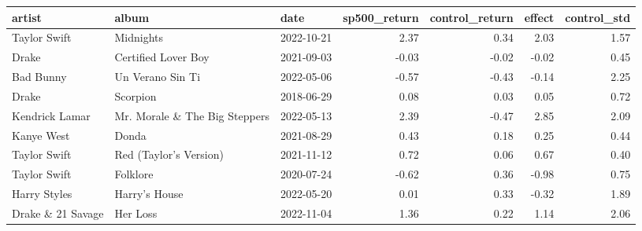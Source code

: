 \begin{tabular}{lllrrrr}
\toprule
artist & album & date & sp500\_return & control\_return & effect & control\_std \\
\midrule
Taylor Swift & Midnights & 2022-10-21 & 2.37 & 0.34 & 2.03 & 1.57 \\
Drake & Certified Lover Boy & 2021-09-03 & -0.03 & -0.02 & -0.02 & 0.45 \\
Bad Bunny & Un Verano Sin Ti & 2022-05-06 & -0.57 & -0.43 & -0.14 & 2.25 \\
Drake & Scorpion & 2018-06-29 & 0.08 & 0.03 & 0.05 & 0.72 \\
Kendrick Lamar & Mr. Morale \& The Big Steppers & 2022-05-13 & 2.39 & -0.47 & 2.85 & 2.09 \\
Kanye West & Donda & 2021-08-29 & 0.43 & 0.18 & 0.25 & 0.44 \\
Taylor Swift & Red (Taylor's Version) & 2021-11-12 & 0.72 & 0.06 & 0.67 & 0.40 \\
Taylor Swift & Folklore & 2020-07-24 & -0.62 & 0.36 & -0.98 & 0.75 \\
Harry Styles & Harry's House & 2022-05-20 & 0.01 & 0.33 & -0.32 & 1.89 \\
Drake \& 21 Savage & Her Loss & 2022-11-04 & 1.36 & 0.22 & 1.14 & 2.06 \\
\bottomrule
\end{tabular}
